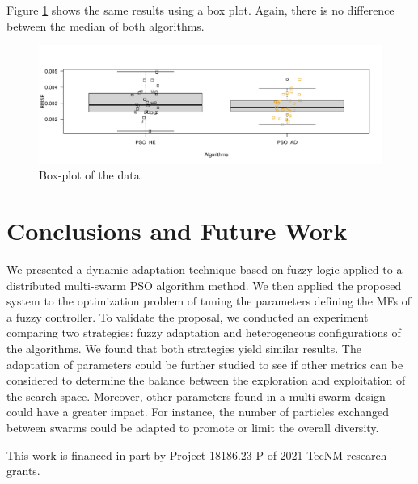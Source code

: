 \documentclass[graybox]{svmult}
\begin{document}
 Figure \ref{fig:boxplot} shows the same results using a box plot. Again, there is no difference between the median of both algorithms.

\begin{figure}[htbp]
  \centering
  \includegraphics[angle=0,width=1\textwidth]{RplotAjusteParam.pdf}
  \caption{Box-plot of the data.}
  \label{fig:boxplot} 
\end{figure}

\section{Conclusions and Future Work}\label{sec:conclusions}

We presented a dynamic adaptation technique based on fuzzy logic applied to a distributed multi-swarm PSO algorithm method. We then applied the proposed system to the optimization problem of tuning the parameters defining the MFs of a fuzzy controller. To validate the proposal, we conducted an experiment comparing two strategies: fuzzy adaptation and heterogeneous configurations of the algorithms. We found that both strategies yield similar results. The adaptation of parameters could be further studied to see if other metrics can be considered to determine the balance between the exploration and exploitation of the search space. Moreover, other parameters found in a multi-swarm design could have a greater impact. For instance, the number of particles exchanged between swarms could be adapted to promote or limit the overall diversity.

\begin{acknowledgement}
    This work is financed in part by Project 18186.23-P of 2021 TecNM research grants.
\end{acknowledgement}


%


%

\end{document}
